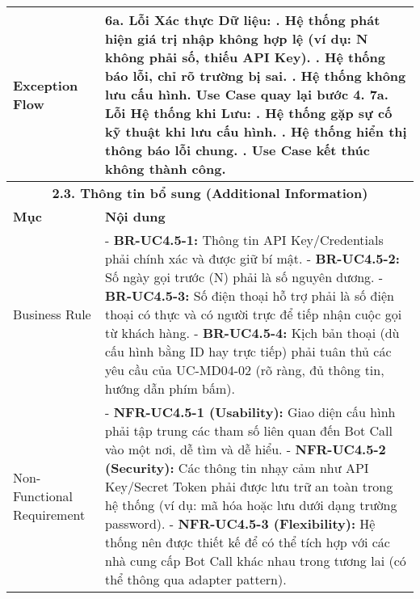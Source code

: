 \begin{longtable}{|m{4cm}|p{11cm}|}
\hline
Exception Flow & \textbf{6a. Lỗi Xác thực Dữ liệu:} \newline    1. Hệ thống phát hiện giá trị nhập không hợp lệ (ví dụ: N không phải số, thiếu API Key). \newline    2. Hệ thống báo lỗi, chỉ rõ trường bị sai. \newline    3. Hệ thống không lưu cấu hình. Use Case quay lại bước 4. \newline \textbf{7a. Lỗi Hệ thống khi Lưu:} \newline    1. Hệ thống gặp sự cố kỹ thuật khi lưu cấu hình. \newline    2. Hệ thống hiển thị thông báo lỗi chung. \newline    3. Use Case kết thúc không thành công. \\
\hline
\multicolumn{2}{|c|}{\textbf{2.3. Thông tin bổ sung (Additional Information)}} \\
\hline
\textbf{Mục} & \textbf{Nội dung} \\
\hline
Business Rule & - \textbf{BR-UC4.5-1:} Thông tin API Key/Credentials phải chính xác và được giữ bí mật. \newline - \textbf{BR-UC4.5-2:} Số ngày gọi trước (N) phải là số nguyên dương. \newline - \textbf{BR-UC4.5-3:} Số điện thoại hỗ trợ phải là số điện thoại có thực và có người trực để tiếp nhận cuộc gọi từ khách hàng. \newline - \textbf{BR-UC4.5-4:} Kịch bản thoại (dù cấu hình bằng ID hay trực tiếp) phải tuân thủ các yêu cầu của UC-MD04-02 (rõ ràng, đủ thông tin, hướng dẫn phím bấm). \\
\hline
Non-Functional Requirement & - \textbf{NFR-UC4.5-1 (Usability):} Giao diện cấu hình phải tập trung các tham số liên quan đến Bot Call vào một nơi, dễ tìm và dễ hiểu. \newline - \textbf{NFR-UC4.5-2 (Security):} Các thông tin nhạy cảm như API Key/Secret Token phải được lưu trữ an toàn trong hệ thống (ví dụ: mã hóa hoặc lưu dưới dạng trường password). \newline - \textbf{NFR-UC4.5-3 (Flexibility):} Hệ thống nên được thiết kế để có thể tích hợp với các nhà cung cấp Bot Call khác nhau trong tương lai (có thể thông qua adapter pattern). \\
\hline
\end{longtable}

